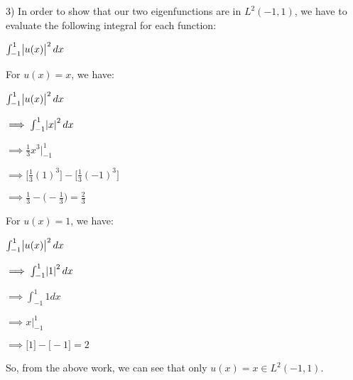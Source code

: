 \documentclass[executivepaper]{article}
\begin{document}
\begin{flushleft}

3) In order to show that our two eigenfunctions are in $L^2(-1,1)$, we have to evaluate the following integral for each function:

\begin{center}

$\int_{-1}^{1} \abs{u(x)}^2 dx$

\end{center}

For $u(x)=x$, we have:

\begin{center}

$\int_{-1}^{1} \abs{u(x)}^2 dx$

\vspace{1mm}

$\implies \int_{-1}^{1} \abs{x}^2 dx$

\vspace{1mm}

$\implies \frac{1}{3}x^3 \Big|_{-1}^{1}$

\vspace{1mm}

$\implies \bigg[\frac{1}{3}(1)^3\bigg]- \bigg[\frac{1}{3}(-1)^3\bigg]$

\vspace{1mm}

$\implies \frac{1}{3}-\bigg(-\frac{1}{3}\bigg)=\frac{2}{3}$

\end{center}

\vspace{3mm}

For $u(x)=1$, we have:

\begin{center}

$\int_{-1}^{1} \abs{u(x)}^2 dx$

\vspace{1mm}

$\implies \int_{-1}^{1} \abs{1}^2 dx$

\vspace{1mm}

$\implies \int_{-1}^{1} 1 dx$

\vspace{1mm}

$\implies x \Big|_{-1}^{1}$

\vspace{1mm}

$\implies \bigg[ 1 \bigg]- \bigg[-1\bigg]=2$

\end{center}

So, from the above work, we can see that only $u(x)=x \in L^2(-1,1)$.

\end{flushleft}
\end{document}
